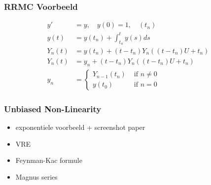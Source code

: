 \documentclass[20pt]{beamer}
\begin{document}
\begin{frame}
    \frametitle{RRMC Voorbeeld}
    \fontsize{15}{17}\selectfont
    \begin{align}
        y'       & = y, \quad y(0) = 1, \quad (t_{n})            \\
        y(t )    & = y(t_{n}) + \int_{t_{n}}^{t}y(s)ds           \\
        Y_{n}(t) & = y(t_{n}) + (t-t_{n})Y_{n}((t-t_{n})U+t_{n}) \\
        Y_{n}(t) & = y_{n} + (t-t_{n})Y_{n}((t-t_{n})U+t_{n})    \\
        y_{n}    & = \begin{cases}
                         Y_{n-1}(t_{n}) & \text{ if } n \neq 0 \\
                         y(t_{0})       & \text{ if } n = 0
                     \end{cases}
    \end{align}
\end{frame}

\begin{frame}
    \frametitle{Unbiased Non-Linearity}
    \begin{itemize}
        \item exponentiele voorbeeld + screenshot paper
        \item VRE
        \item Feynman-Kac formule
        \item Magnus series
    \end{itemize}
\end{frame}
\end{document}
